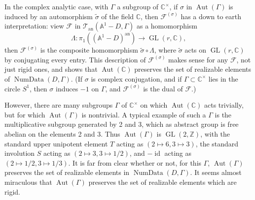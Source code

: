 In the complex analytic case, with \(\Gamma\) a subgroup of \(\mathbb{C}^{\times}\), if \(\sigma\) in \(\operatorname{Aut}(\Gamma)\) is induced by an automorphism \(\widetilde{\sigma}\) of the field \(\mathbb{C}\), then \(\mathcal{F}^{(\sigma)}\) has a down to earth interpretation: view \(\mathcal{F}\) in \(\mathcal{T}_{\mathrm{an}}(\mathbb{A}^1-D,\Gamma)\) as a homomorphism
\[
\Lambda:\pi_1((\mathbb{A}^1-D)^{\mathrm{an}})\to\operatorname{GL}(r,\mathbb{C}),
\]
then \(\mathcal{F}^{(\sigma)}\) is the composite homomorphism \(\widetilde{\sigma}\circ\Lambda\), where \(\widetilde{\sigma}\) acts on \(\operatorname{GL}(r,\mathbb{C})\) by conjugating every entry. This description of \(\mathcal{F}^{(\sigma)}\) makes sense for any \(\mathcal{F}\), not just rigid ones, and shows that \(\operatorname{Aut}(\mathbb{C})\) preserves the set of realizable elements of \(\operatorname{NumData}(D,\Gamma)\). (If \(\sigma\) is complex conjugation, and if \(\Gamma\subset\mathbb{C}^{\times}\) lies in the circle \(S^1\), then \(\sigma\) induces \(-1\) on \(\Gamma\), and \(\mathcal{F}^{(\sigma)}\) is the dual of \(\mathcal{F}\).)

However, there are many subgroups \(\Gamma\) of \(\mathbb{C}^{\times}\) on which \(\operatorname{Aut}(\mathbb{C})\) acts trivially, but for which \(\operatorname{Aut}(\Gamma)\) is nontrivial. A typical example of such a \(\Gamma\) is the multiplicative subgroup generated by 2 and 3, which as abstract group is free abelian on the elements 2 and 3. Thus \(\operatorname{Aut}(\Gamma)\) is \(\operatorname{GL}(2,\mathbb{Z})\), with the standard upper unipotent element \(T\) acting as \((2\mapsto 6,3\mapsto 3)\), the standard involution \(S\) acting as \((2\mapsto 3,3\mapsto 1/2)\), and \(-\operatorname{id}\) acting as \((2\mapsto 1/2,3\mapsto 1/3)\). It is far from clear whether or not, for this \(\Gamma\), \(\operatorname{Aut}(\Gamma)\) preserves the set of realizable elements in \(\operatorname{NumData}(D,\Gamma)\). It seems almost miraculous that \(\operatorname{Aut}(\Gamma)\) preserves the set of realizable elements which are rigid.


